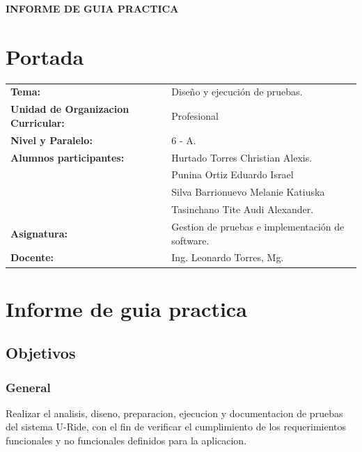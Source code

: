 \documentclass{article}
\begin{document}
\begin{center}
    {\large \textbf{INFORME DE GUIA PRACTICA}}\\[0.2cm]
\end{center}

\section{Portada}
\begin{flushleft}
    \begin{tabular}{>{\bfseries}p{7cm} p{10cm}}
        Tema:                              & Diseño y ejecución de pruebas.                   \\
        Unidad de Organizacion Curricular: & Profesional                                      \\
        Nivel y Paralelo:                  & 6 - A.                                           \\
        Alumnos participantes:             & Hurtado Torres Christian Alexis.                 \\
                                           & Punina Ortiz Eduardo Israel                      \\
                                           & Silva Barrionuevo Melanie Katiuska               \\
                                           & Tasinchano Tite Audi Alexander.                  \\
        Asignatura:                        & Gestion de pruebas e implementación de software. \\
        Docente:                           & Ing. Leonardo Torres, Mg.                        \\
    \end{tabular}
\end{flushleft}

\section{Informe de guia practica}

\subsection{Objetivos}
\subsubsection{General}
Realizar el analisis, diseno, preparacion, ejecucion y documentacion de pruebas del sistema U-Ride, con el fin de verificar el cumplimiento de los requerimientos funcionales y no funcionales definidos para la aplicacion.
\end{document}
